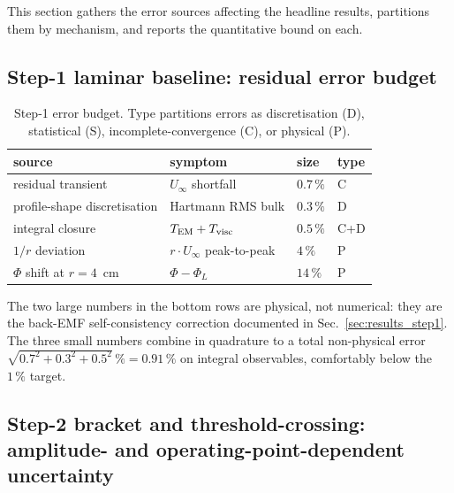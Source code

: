 \documentclass[aps,prl,twocolumn,superscriptaddress]{revtex4-2}
\begin{document}
This section gathers the error sources affecting the headline
results, partitions them by mechanism, and reports the quantitative
bound on each.

\subsection{Step-1 laminar baseline: residual error budget}

\begin{table}[h!]
\centering
\caption{Step-1 error budget.  Type partitions errors as
discretisation (D), statistical (S), incomplete-convergence (C), or
physical (P).}
\label{tab:err_budget}
\begin{tabular}{|l|l|l|l|}\hline
source & symptom & size & type \\ \hline
residual transient & $U_\infty$ shortfall & $0.7\,\%$ & C \\
profile-shape discretisation & Hartmann RMS bulk & $0.3\,\%$ & D \\
integral closure & $T_{\rm EM}+T_{\rm visc}$ & $0.5\,\%$ & C+D \\
$1/r$ deviation & $r\!\cdot\!U_\infty$ peak-to-peak & $4\,\%$ & P \\
$\Phi$ shift at $r=4$~cm & $\Phi - \Phi_L$ & $14\,\%$ & P \\ \hline
\end{tabular}
\end{table}

The two large numbers in the bottom rows are physical, not numerical:
they are the back-EMF self-consistency correction documented in
Sec.~\ref{sec:results_step1}.  The three small numbers combine in
quadrature to a total non-physical error
$\sqrt{0.7^{2}+0.3^{2}+0.5^{2}}\,\% = 0.91\,\%$ on integral
observables, comfortably below the $1\,\%$ target.

\subsection{Step-2 bracket and threshold-crossing: amplitude- and
operating-point-dependent uncertainty}
\end{document}
